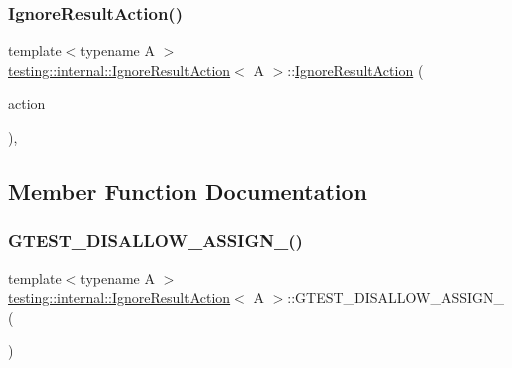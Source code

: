 \subsubsection{\texorpdfstring{IgnoreResultAction()}{IgnoreResultAction()}\hspace{0.1cm}{\footnotesize\ttfamily [3/3]}}
{\footnotesize\ttfamily template$<$typename A $>$ \\
\mbox{\hyperlink{classtesting_1_1internal_1_1_ignore_result_action}{testing\+::internal\+::\+Ignore\+Result\+Action}}$<$ A $>$\+::\mbox{\hyperlink{classtesting_1_1internal_1_1_ignore_result_action}{Ignore\+Result\+Action}} (\begin{DoxyParamCaption}\item[{const A \&}]{action }\end{DoxyParamCaption})\hspace{0.3cm}{\ttfamily [inline]}, {\ttfamily [explicit]}}



\subsection{Member Function Documentation}
\mbox{\label{classtesting_1_1internal_1_1_ignore_result_action_a6d42dfd3fd05fbbd24f6856e7bd82ab9}} 
\subsubsection{\texorpdfstring{GTEST\_DISALLOW\_ASSIGN\_()}{GTEST\_DISALLOW\_ASSIGN\_()}\hspace{0.1cm}{\footnotesize\ttfamily [1/3]}}
{\footnotesize\ttfamily template$<$typename A $>$ \\
\mbox{\hyperlink{classtesting_1_1internal_1_1_ignore_result_action}{testing\+::internal\+::\+Ignore\+Result\+Action}}$<$ A $>$\+::G\+T\+E\+S\+T\+\_\+\+D\+I\+S\+A\+L\+L\+O\+W\+\_\+\+A\+S\+S\+I\+G\+N\+\_\+ (\begin{DoxyParamCaption}\item[{\mbox{\hyperlink{classtesting_1_1internal_1_1_ignore_result_action}{Ignore\+Result\+Action}}$<$ A $>$}]{ }\end{DoxyParamCaption})\hspace{0.3cm}{\ttfamily [private]}}


